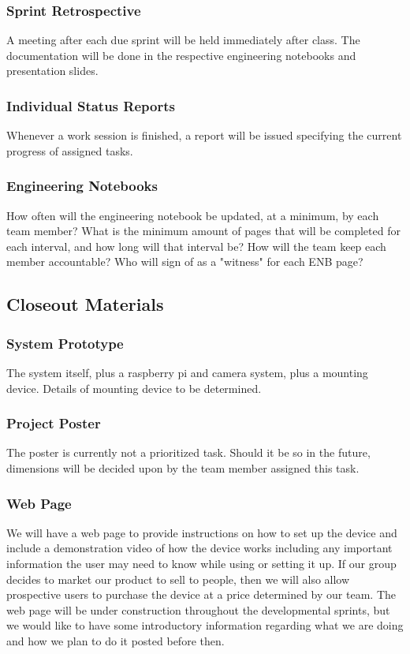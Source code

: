 \subsubsection{Sprint Retrospective}
A meeting after each due sprint will be held immediately after class.  The documentation will be done in the respective engineering notebooks and presentation slides.

\subsubsection{Individual Status Reports}
Whenever a work session is finished, a report will be issued specifying the current progress of assigned tasks.

\subsubsection{Engineering Notebooks}
How often will the engineering notebook be updated, at a minimum, by each team member? What is the minimum amount of pages that will be completed for each interval, and how long will that interval be? How will the team keep each member accountable? Who will sign of as a "witness" for each ENB page?

\subsection{Closeout Materials}

\subsubsection{System Prototype}
The system itself, plus a raspberry pi and camera system, plus a mounting device.  Details of mounting device to be determined.

\subsubsection{Project Poster}
The poster is currently not a prioritized task.  Should it be so in the future, dimensions will be decided upon by the team member assigned this task.

\subsubsection{Web Page}
We will have a web page to provide instructions on how to set up the device and include a demonstration video of how the device works including any important information the user may need to know while using or setting it up. If our group decides to market our product to sell to people, then we will also allow prospective users to purchase the device at a price determined by our team. The web page will be under construction throughout the developmental sprints, but we would like to have some introductory information regarding what we are doing and how we plan to do it posted before then.


